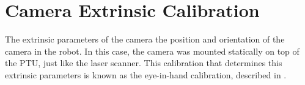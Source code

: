 \section{Camera Extrinsic Calibration}
\label{section:camera-extrinsic-calibration}

The extrinsic parameters of the camera the position and orientation of the camera in the robot. In this case, the camera was mounted statically on top of the PTU, just like the laser scanner. This calibration that determines this extrinsic parameters is known as the eye-in-hand calibration, described in \cite{horaud95}.

